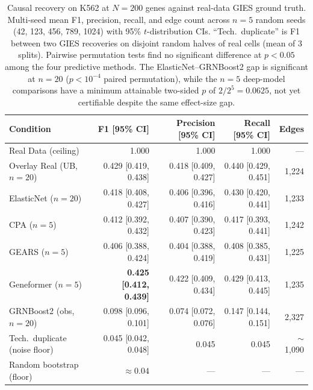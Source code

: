\documentclass{article}
\theoremstyle{plain}
\theoremstyle{definition}
\theoremstyle{remark}
\begin{document}
\begin{table}[t]
\caption{Causal recovery on K562 at $N{=}200$ genes against real-data GIES ground truth. Multi-seed mean F1, precision, recall, and edge count across $n=5$ random seeds (42, 123, 456, 789, 1024) with 95\% $t$-distribution CIs. ``Tech.\ duplicate'' is F1 between two GIES recoveries on disjoint random halves of real cells (mean of 3 splits). Pairwise permutation tests find no significant difference at $p<0.05$ among the four predictive methods. The ElasticNet--GRNBoost2 gap is significant at $n=20$ ($p<10^{-4}$ paired permutation), while the $n=5$ deep-model comparisons have a minimum attainable two-sided $p$ of $2/2^5 = 0.0625$, not yet certifiable despite the same effect-size gap.}
\label{tab:main}
\vskip 0.1in
\centering
\small
\begin{tabular}{lrrrr}
\toprule
\textbf{Condition} & \textbf{F1 [95\% CI]} & \textbf{Precision [95\% CI]} & \textbf{Recall [95\% CI]} & \textbf{Edges} \\
\midrule
Real Data (ceiling)   & 1.000                & 1.000                & 1.000                & --- \\
Overlay Real (UB, $n{=}20$) & 0.429 [0.419, 0.438] & 0.418 [0.409, 0.427] & 0.440 [0.429, 0.451] & 1{,}224 \\
ElasticNet ($n{=}20$) & 0.418 [0.408, 0.427] & 0.406 [0.396, 0.416] & 0.430 [0.420, 0.441] & 1{,}233 \\
CPA ($n{=}5$)         & 0.412 [0.392, 0.432] & 0.407 [0.390, 0.423] & 0.417 [0.393, 0.441] & 1{,}242 \\
GEARS ($n{=}5$)       & 0.406 [0.388, 0.424] & 0.404 [0.388, 0.419] & 0.408 [0.385, 0.431] & 1{,}225 \\
Geneformer ($n{=}5$)  & \textbf{0.425 [0.412, 0.439]} & 0.422 [0.409, 0.434] & 0.429 [0.413, 0.445] & 1{,}235 \\
GRNBoost2 (obs, $n{=}20$) & 0.098 [0.096, 0.101] & 0.074 [0.072, 0.076] & 0.147 [0.144, 0.151] & 2{,}327 \\
\midrule
Tech.\ duplicate (noise floor) & 0.045 [0.042, 0.048] & 0.045 & 0.045 & $\sim$1{,}090 \\
Random bootstrap (floor)       & $\approx 0.04$  & ---             & ---             & --- \\
\bottomrule
\end{tabular}
\vskip -0.1in
\end{table}
\end{document}
